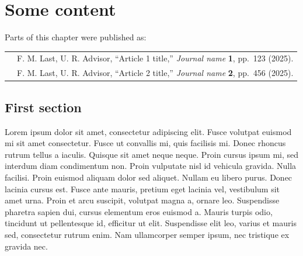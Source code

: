 \documentclass[main.tex]{subfiles}
\begin{document}
\chapter{Some content}

\begin{tcolorbox}[float=b,
                  width=\textwidth,
                  left=1em,
                  right=1em,
                  top=0.5em,
                  bottom=0.5em,
                  boxrule=0pt,
                  colframe=white,
                  ]%
    \footnotesize
    \uwsinglespace
    Parts of this chapter were published as:
    
    \vspace{0.5em}
    \begin{tabularx}{1\textwidth}{l X}
        \cite{} & F. M. Last, U. R. Advisor, ``Article 1 title,'' \textit{Journal name} \textbf{1}, pp.~123 (2025). \\
        \cite{} & F. M. Last, U. R. Advisor, ``Article 2 title,'' \textit{Journal name} \textbf{2}, pp.~456 (2025).
    \end{tabularx}
\end{tcolorbox}



\section{First section}
Lorem ipsum dolor sit amet, consectetur adipiscing elit. Fusce volutpat euismod mi sit amet consectetur. Fusce ut convallis mi, quis facilisis mi. Donec rhoncus rutrum tellus a iaculis. Quisque sit amet neque neque. Proin cursus ipsum mi, sed interdum diam condimentum non. Proin vulputate nisl id vehicula gravida. Nulla facilisi. Proin euismod aliquam dolor sed aliquet. Nullam eu libero purus. Donec lacinia cursus est. Fusce ante mauris, pretium eget lacinia vel, vestibulum sit amet urna. Proin et arcu suscipit, volutpat magna a, ornare leo. Suspendisse pharetra sapien dui, cursus elementum eros euismod a. Mauris turpis odio, tincidunt ut pellentesque id, efficitur ut elit. Suspendisse elit leo, varius et mauris sed, consectetur rutrum enim. Nam ullamcorper semper ipsum, nec tristique ex gravida nec.
\end{document}
